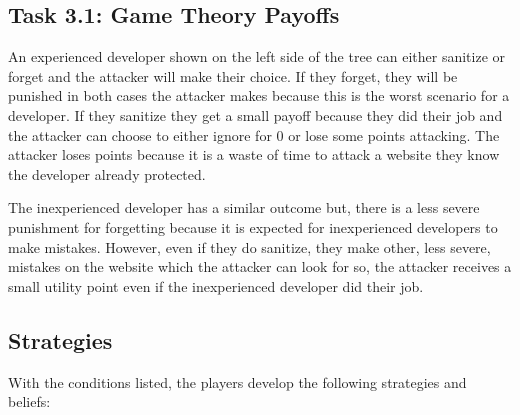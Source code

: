 \documentclass[letterpaper,12pt]{report}
\begin{document}
\subsection*{Task 3.1: Game Theory Payoffs}

An experienced developer shown on the left side of the tree can either sanitize or forget and the attacker will make their choice. If they forget, they will be punished in both cases the attacker makes because this is the worst scenario for a developer. If they sanitize they get a small payoff because they did their job and the attacker can choose to either ignore for 0 or lose some points attacking. The attacker loses points because it is a waste of time to attack a website they know the developer already protected.

The inexperienced developer has a similar outcome but, there is a less severe punishment for forgetting because it is expected for inexperienced developers to make mistakes. However, even if they do sanitize, they make other, less severe, mistakes on the website which the attacker can look for so, the attacker receives a small utility point even if the inexperienced developer did their job.

\subsection*{Strategies}

With the conditions listed, the players develop the following strategies and beliefs:
\end{document}
